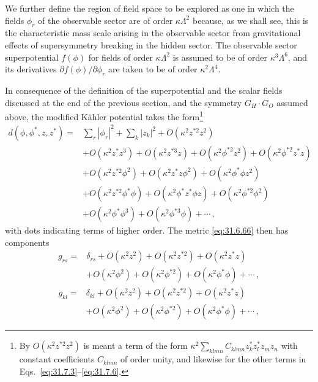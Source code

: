 We further define the region of field space to be explored as one in which
the fields \(\phi_r\) of the observable sector are of order
\(\kappa\Lambda^2\) because, as we shall see, this is the characteristic
mass scale arising in the observable sector from gravitational effects of
supersymmetry breaking in the hidden sector. The observable sector
superpotential \(f(\phi)\) for fields of order \(\kappa\Lambda^2\) is
assumed to be of order \(\kappa^3\Lambda^6\), and its derivatives
\(\partial f(\phi)/\partial\phi_r\) are taken to be of order
\(\kappa^2\Lambda^4\).

In consequence of the definition of the superpotential and the scalar
fields discussed at the end of the previous section, and the symmetry
\(G_H\cdot G_O\) assumed above, the modified Kähler potential takes the
form\footnote{By \(O(\kappa^2z^{*2}z^2)\) is meant a term of the form
\(\kappa^2\sum_{klmn}C_{klmn}z_k^*z_l^*z_mz_n\) with constant coefficients
\(C_{klmn}\) of order unity, and likewise for the other terms in
Eqs.~\eqref{eq:31.7.3}--\eqref{eq:31.7.6}.}
\begin{equation}
  \begin{aligned}
  d(\phi,\phi^*,z,z^*)={}&
    \sum_r|\phi_r|^2+\sum_k|z_k|^2+O(\kappa^2z^{*2}z^2)
  \\
  &+O(\kappa^2z^*z^3)+O(\kappa^2z^{*3}z)
    +O(\kappa^2\phi^{*2}z^2)+O(\kappa^2\phi^{*2}z^*z)
  \\
  &+O(\kappa^2z^{*2}\phi^2)+O(\kappa^2z^*z\phi^2)
    +O(\kappa^2\phi^*\phi z^2)
  \\
  &+O(\kappa^2z^{*2}\phi^*\phi)
    +O(\kappa^2\phi^*z^*\phi z)+O(\kappa^2\phi^{*2}\phi^2)
  \\
  &+O(\kappa^2\phi^*\phi^3)+O(\kappa^2\phi^{*3}\phi)+\cdots\,,
  \end{aligned}
  \tag{31.7.3}\label{eq:31.7.3}
\end{equation}
with dots indicating terms of higher order. The metric \eqref{eq:31.6.66}
then has components
\begin{equation}
  \begin{aligned}
  g_{rs}={}&\delta_{rs}
  +O(\kappa^2z^2)+O(\kappa^2z^{*2})+O(\kappa^2z^*z)
  \\
  &+O(\kappa^2\phi^2)+O(\kappa^2\phi^{*2})
  +O(\kappa^2\phi^*\phi)+\cdots\,,
  \end{aligned}
  \tag{31.7.4}\label{eq:31.7.4}
\end{equation}
\begin{equation}
  \begin{aligned}
  g_{kl}={}&\delta_{kl}
  +O(\kappa^2z^2)+O(\kappa^2z^{*2})+O(\kappa^2z^*z)
  \\
  &+O(\kappa^2\phi^2)+O(\kappa^2\phi^{*2})
  +O(\kappa^2\phi^*\phi)+\cdots\,,
  \end{aligned}
  \tag{31.7.5}\label{eq:31.7.5}
\end{equation}
